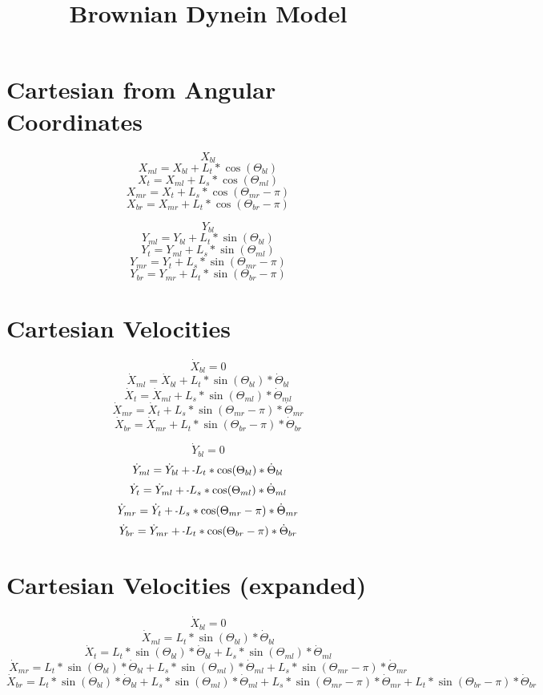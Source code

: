 \documentclass[11pt, landscape]{article}
\title{Brownian Dynein Model}
\newcommand{\mn}{\scalebox{0.7}[1.0]{-}}
\begin{document}
\maketitle

\section{Cartesian from Angular Coordinates}
$$X_{bl}$$
$$X_{ml} = X_{bl}+L_{t}*\cos(\Theta_{bl})$$
$$X_{t}  = X_{ml}+L_{s}*\cos(\Theta_{ml})$$
$$X_{mr} = X_{t} +L_{s}*\cos(\Theta_{mr}-\pi)$$
$$X_{br} = X_{mr}+L_{t}*\cos(\Theta_{br}-\pi)$$

$$Y_{bl}$$
$$Y_{ml} = Y_{bl}+L_{t}*\sin(\Theta_{bl})$$
$$Y_{t}  = Y_{ml}+L_{s}*\sin(\Theta_{ml})$$
$$Y_{mr} = Y_{t} +L_{s}*\sin(\Theta_{mr}-\pi)$$
$$Y_{br} = Y_{mr}+L_{t}*\sin(\Theta_{br}-\pi)$$

\section{Cartesian Velocities}
$$\dot{X}_{bl} = 0$$
$$\dot{X}_{ml} = \dot{X}_{bl} + L_{t}*\sin(\Theta_{bl})     * \dot{\Theta}_{bl}$$
$$\dot{X}_{t } = \dot{X}_{ml} + L_{s}*\sin(\Theta_{ml})     * \dot{\Theta}_{ml}$$
$$\dot{X}_{mr} = \dot{X}_{t } + L_{s}*\sin(\Theta_{mr}-\pi) * \dot{\Theta}_{mr}$$
$$\dot{X}_{br} = \dot{X}_{mr} + L_{t}*\sin(\Theta_{br}-\pi) * \dot{\Theta}_{br}$$
                                                                               
$$\dot{Y}_{bl} = 0$$                                                               
$$\dot{Y}_{ml} = \dot{Y}_{bl} + \mn L_{t}*\cos(\Theta_{bl})     * \dot{\Theta}_{bl}$$
$$\dot{Y}_{t}  = \dot{Y}_{ml} + \mn L_{s}*\cos(\Theta_{ml})     * \dot{\Theta}_{ml}$$
$$\dot{Y}_{mr} = \dot{Y}_{t } + \mn L_{s}*\cos(\Theta_{mr}-\pi) * \dot{\Theta}_{mr}$$
$$\dot{Y}_{br} = \dot{Y}_{mr} + \mn L_{t}*\cos(\Theta_{br}-\pi) * \dot{\Theta}_{br}$$

\section{Cartesian Velocities (expanded)}
$$\dot{X}_{bl} = 0$$
$$\dot{X}_{ml} = L_{t}*\sin(\Theta_{bl}) * \dot{\Theta}_{bl}$$
$$\dot{X}_{t } = L_{t}*\sin(\Theta_{bl}) * \dot{\Theta}_{bl} + L_{s}*\sin(\Theta_{ml})     * \dot{\Theta}_{ml}$$
$$\dot{X}_{mr} = L_{t}*\sin(\Theta_{bl}) * \dot{\Theta}_{bl} + L_{s}*\sin(\Theta_{ml})     * \dot{\Theta}_{ml} + L_{s}*\sin(\Theta_{mr}-\pi) * \dot{\Theta}_{mr}$$
$$\dot{X}_{br} = L_{t}*\sin(\Theta_{bl}) * \dot{\Theta}_{bl} + L_{s}*\sin(\Theta_{ml})     * \dot{\Theta}_{ml} + L_{s}*\sin(\Theta_{mr}-\pi) * \dot{\Theta}_{mr} + L_{t}*\sin(\Theta_{br}-\pi) * \dot{\Theta}_{br}$$
                                                                               
\end{document}
